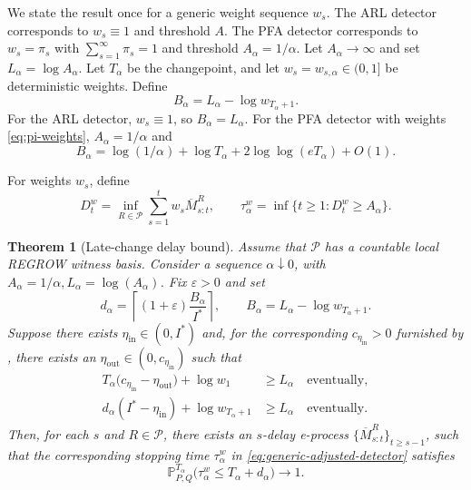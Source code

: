 \documentclass[12pt]{article}
\theoremstyle{spaced}
\newtheorem{theorem}{Theorem}[section]
\theoremstyle{remark}
\newcommand{\calP}{\mathcal P}
\newcommand{\eps}{\varepsilon}
\begin{document}
We state the result once for a generic weight sequence $w_s$.  The ARL detector corresponds to $w_s\equiv1$ and threshold $A$.  The PFA detector corresponds to $w_s=\pi_s$ with $\sum_{s=1}^\infty\pi_s=1$ and threshold $A_\alpha=1/\alpha$.
Let $A_\alpha\to\infty$ and set $L_\alpha=\log A_\alpha$.  Let $T_\alpha$ be the changepoint, and let $w_s=w_{s,\alpha}\in(0,1]$ be deterministic weights.  Define
\begin{equation}\label{eq:Balpha}
  B_\alpha=L_\alpha-\log w_{T_\alpha+1}.
\end{equation}
For the ARL detector, $w_s\equiv1$, so $B_\alpha=L_\alpha$.  For the PFA detector with weights \eqref{eq:pi-weights}, $A_\alpha=1/\alpha$ and
\[
  B_\alpha=\log(1/\alpha)+\log T_\alpha+2\log\log(eT_\alpha)+O(1).
\]


For weights $w_s$, define 
\begin{equation}\label{eq:generic-adjusted-detector}
  D_t^w=\inf_{R\in\calP}\sum_{s=1}^t w_s\overline M_{s:t}^R,
  \qquad
  \tau_\alpha^w=\inf\{t\ge1:D_t^w\ge A_\alpha\}.
\end{equation}

\begin{theorem}[Late-change delay bound]
\label{thm:delay-upper-generic}
Assume that $\calP$ has a countable local REGROW witness basis.  Consider a sequence
$\alpha\downarrow 0$, with $A_\alpha=1/\alpha, L_\alpha=\log(A_\alpha)$.  Fix $\eps>0$ and set
\[
  d_\alpha=\left\lceil (1+\eps)\frac{B_\alpha}{I^*}\right\rceil,
  \qquad
  B_\alpha=L_\alpha-\log w_{T_\alpha+1}.
\]
Suppose there exists $\eta_{\mathrm{in}}\in(0,I^*)$ and, for the corresponding
$c_{\eta_{\mathrm{in}}}>0$ furnished by
, there exists an
$\eta_{\mathrm{out}}\in(0,c_{\eta_{\mathrm{in}}})$ such that
\begin{align}
  T_\alpha
  \bigl(c_{\eta_{\mathrm{in}}}-\eta_{\mathrm{out}}\bigr)
  +\log w_1
  &\ge L_\alpha
  \quad\text{eventually},
  \label{eq:anchor-condition}\\
  d_\alpha(I^*-\eta_{\mathrm{in}})
  +\log w_{T_\alpha+1}
  &\ge L_\alpha
  \quad\text{eventually}.
  \label{eq:post-condition}
\end{align}
Then, for each $s$ and $R\in\calP$, there exists an $s$-delay e-process
$\{\overline M_{s:t}^R\}_{t\geq s-1}$, such that the corresponding stopping time
$\tau_\alpha^w$ in \eqref{eq:generic-adjusted-detector} satisfies
\[
  \mathbb P_{P,Q}^{T_\alpha}
  \bigl(\tau_\alpha^w\le T_\alpha+d_\alpha\bigr)\to1.
\]
\end{theorem}
\end{document}
